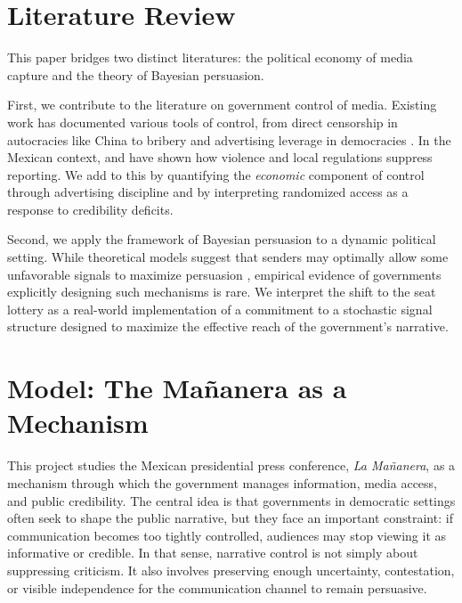 \documentclass[12pt]{article}
\begin{document}
\section{Literature Review}

This paper bridges two distinct literatures: the political economy of media capture and the theory of Bayesian persuasion.

First, we contribute to the literature on government control of media. Existing work has documented various tools of control, from direct censorship in autocracies like China \citep{CensorshipCollective-King-APSR, CensorshipChina-King-Science} to bribery \citep{Peru-Macmillan-JEP} and advertising leverage in democracies \citep{ArgCorr-DiTella-AEJAE, MediaCaptures-Zeidl-Econometrica}. In the Mexican context, \cite{MexicanPressStanigAJPS} and \cite{Marshall} have shown how violence and local regulations suppress reporting. We add to this by quantifying the \textit{economic} component of control through advertising discipline and by interpreting randomized access as a response to credibility deficits.

Second, we apply the framework of Bayesian persuasion \citep{MediaBias-Gentzkow-JPE} to a dynamic political setting. While theoretical models suggest that senders may optimally allow some unfavorable signals to maximize persuasion \citep{PersuasionEmpirical-Dellavigna-AR}, empirical evidence of governments explicitly designing such mechanisms is rare. We interpret the shift to the seat lottery as a real-world implementation of a commitment to a stochastic signal structure designed to maximize the effective reach of the government's narrative.

\section{Model: The Mañanera as a Mechanism}

This project studies the Mexican presidential press conference, \textit{La Mañanera}, as a mechanism through which the government manages information, media access, and public credibility. The central idea is that governments in democratic settings often seek to shape the public narrative, but they face an important constraint: if communication becomes too tightly controlled, audiences may stop viewing it as informative or credible. In that sense, narrative control is not simply about suppressing criticism. It also involves preserving enough uncertainty, contestation, or visible independence for the communication channel to remain persuasive.
\end{document}
